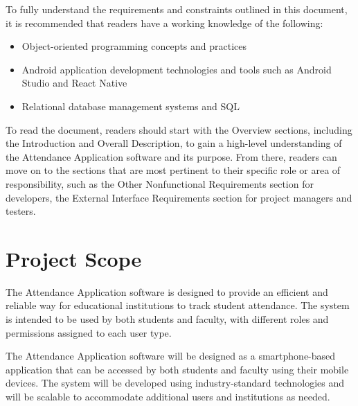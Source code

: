 \documentclass{scrreprt}
\begin{document}
To fully understand the requirements and constraints outlined in this document, it is recommended that readers have a working knowledge of the following:

\begin{itemize}
    \item Object-oriented programming concepts and practices
    \item Android application development technologies and tools such as Android Studio and React Native
    \item Relational database management systems and SQL
\end{itemize}

To read the document, readers should start with the Overview sections, including the Introduction and Overall Description,
 to gain a high-level understanding of the Attendance Application software and its purpose. From there, readers can move on to the sections 
 that are most pertinent to their specific role or area of responsibility, such as the Other Nonfunctional Requirements section for developers,
  the External Interface Requirements section for project managers and testers. 

\section{Project Scope}
The Attendance Application software is designed to provide an efficient and reliable way for educational institutions to track student attendance. The system is intended to be used by both students and faculty, with different roles and permissions assigned to each user type.

The Attendance Application software will be designed as a smartphone-based application that can be accessed by both students and faculty using their mobile devices. The system will be developed using industry-standard technologies and will be scalable to accommodate additional users and institutions as needed.

\end{document}
